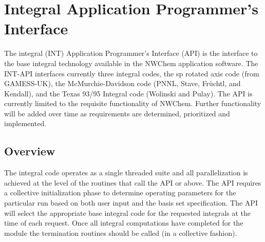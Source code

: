 %
%
% 
% 
\section{Integral Application Programmer's Interface} 
\label{sec:intapi}
The integral (INT) Application Programmer's Interface (API) is the 
interface to the base integral technology available in the NWChem 
application software.  The INT-API interfaces currently three integral 
codes, the sp rotated axis code (from GAMESS-UK), the 
McMurchie-Davidson code (PNNL, Stave, Fr\"uchtl, and Kendall), and the 
Texas 93/95 Integral code (Wolinski and Pulay).  The API is currently 
limited to the requisite functionality of NWChem.  Further 
functionality will be added over time as requirements are determined, 
prioritized and implemented.   
 
\subsection{Overview} 
The integral code operates as a single threaded suite and all 
parallelization is achieved at the level of the routines that call the 
API or above.  The API requires a collective initialization phase to 
determine operating parameters for the particular run based on both 
user input and the basis set specification.  The API will select the 
appropriate base integral code for the requested integrals at the time 
of each request.  Once all integral computations have completed for 
the module the termination routines should be called (in a collective 
fashion). 
 
